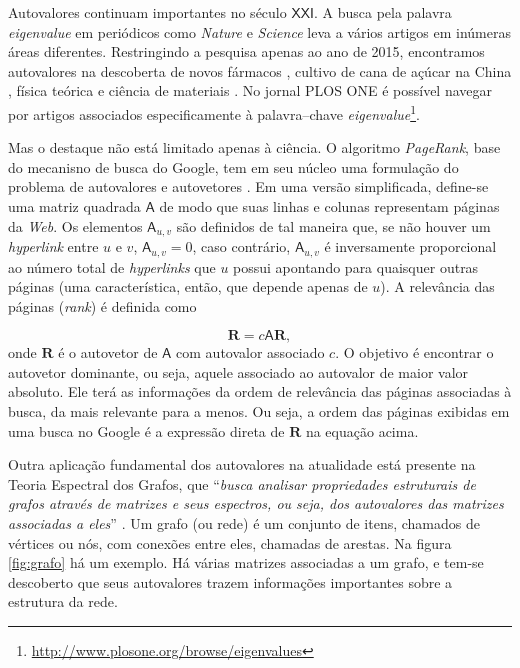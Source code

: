 	Autovalores continuam importantes no século $\mathsf{XXI}$. A busca pela palavra \emph{eigenvalue} em periódicos como \emph{Nature} e \emph{Science} leva a vários artigos em inúmeras áreas diferentes. Restringindo a pesquisa apenas ao ano de 2015, encontramos autovalores na descoberta de novos fármacos \cite{avMedicamento2015}, cultivo de cana de açúcar na China \cite{avCana2015}, física teórica \cite{avFisTeo2015} e ciência de materiais \cite{avCienciaMateriais2015}. No jornal PLOS ONE é possível navegar por artigos associados especificamente à palavra--chave \emph{eigenvalue}\footnote{\href{http://www.plosone.org/browse/eigenvalues}{http://www.plosone.org/browse/eigenvalues}}.
	
	Mas o destaque não está limitado apenas à ciência. O algoritmo \emph{PageRank}, base do mecanisno de busca do Google, tem em seu núcleo uma formulação do problema de autovalores e autovetores \cite{BrinPage98}. Em uma versão simplificada, define-se uma matriz quadrada $\mathsf{A}$ de modo que suas linhas e colunas representam páginas da \emph{Web}. Os elementos $\mathsf{A}_{u,v}$ são definidos de tal maneira que, se não houver um \emph{hyperlink} entre $u$ e $v$, $\mathsf{A}_{u,v} = 0$, caso contrário, $\mathsf{A}_{u,v}$ é inversamente proporcional ao número total de \emph{hyperlinks} que $u$ possui apontando para quaisquer outras páginas (uma característica, então, que depende apenas de $u$). A relevância das páginas (\emph{rank}) é definida como
	
	\begin{equation}
		\mathsf{\textbf{R}} = c\mathsf{A}\mathsf{\textbf{R}},
	\end{equation}
	onde $\mathsf{\textbf{R}}$ é o autovetor de $\mathsf{A}$ com autovalor associado $c$. O objetivo é encontrar o autovetor dominante, ou seja, aquele associado ao autovalor de maior valor absoluto. Ele terá as informações da ordem de relevância das páginas associadas à busca, da mais relevante para a menos. Ou seja, a ordem das páginas exibidas em uma busca no Google é a expressão direta de $\mathsf{\textbf{R}}$ na equação acima.
	
	Outra aplicação fundamental dos autovalores na atualidade está presente na Teoria Espectral dos Grafos, que ``\textit{busca analisar propriedades estruturais
de grafos através de matrizes e seus espectros, ou seja,
dos autovalores das matrizes associadas a eles}'' \cite{TEG2014}. Um grafo (ou rede) é um conjunto de itens, chamados de vértices ou nós, com conexões entre eles, chamadas de arestas. Na figura \ref{fig:grafo} há um exemplo. Há várias matrizes associadas a um grafo, e tem-se descoberto que seus autovalores trazem informações importantes sobre a estrutura da rede.
	
